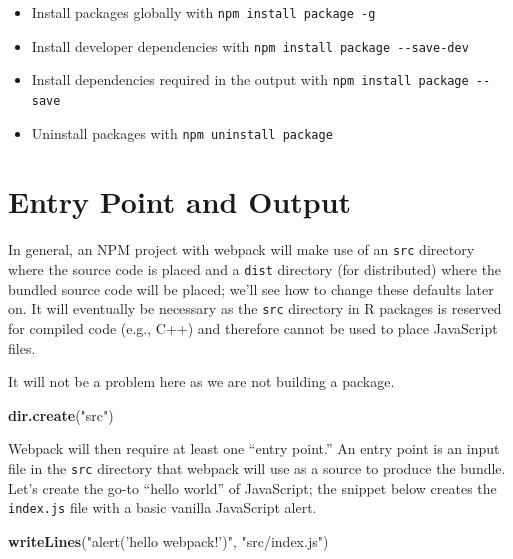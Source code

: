 \documentclass[10pt,]{krantz}
\makeatletter
\newenvironment{Shaded}{\begin{snugshade}}{\end{snugshade}}
\newcommand{\KeywordTok}[1]{\textcolor[rgb]{0.27,0.27,0.27}{\textbf{#1}}}
\newcommand{\NormalTok}[1]{#1}
\newcommand{\StringTok}[1]{\textcolor[rgb]{0.5,0.5,0.5}{#1}}
\providecommand{\tightlist}{%
  \setlength{\itemsep}{0pt}\setlength{\parskip}{0pt}}
\newenvironment{kframe}{%
\medskip{}
\setlength{\fboxsep}{.8em}
 \def\at@end@of@kframe{}%
 \ifinner\ifhmode%
  \def\at@end@of@kframe{\end{minipage}}%
  \begin{minipage}{\columnwidth}%
 \fi\fi%
 \def\FrameCommand##1{\hskip\@totalleftmargin \hskip-\fboxsep
 \colorbox{shadecolor}{##1}\hskip-\fboxsep
     \hskip-\linewidth \hskip-\@totalleftmargin \hskip\columnwidth}%
 \MakeFramed {\advance\hsize-\width
   \@totalleftmargin\z@ \linewidth\hsize
   \@setminipage}}%
 {\par\unskip\endMakeFramed%
 \at@end@of@kframe}
\renewenvironment{Shaded}{\begin{kframe}}{\end{kframe}}
\makeatother
\begin{document}
\begin{itemize}
\tightlist
\item
  Install packages globally with \texttt{npm\ install\ package\ -g}
\item
  Install developer dependencies with \texttt{npm\ install\ package\ -\/-save-dev}
\item
  Install dependencies required in the output with \texttt{npm\ install\ package\ -\/-save}
\item
  Uninstall packages with \texttt{npm\ uninstall\ package}
\end{itemize}

\hypertarget{webpack-intro-entry-points}{%
\section{Entry Point and Output}\label{webpack-intro-entry-points}}

In general, an NPM project with webpack will make use of an \texttt{src} directory where the source code is placed and a \texttt{dist} directory (for distributed) where the bundled source code will be placed; we'll see how to change these defaults later on. It will eventually be necessary as the \texttt{src} directory in R packages is reserved for compiled code (e.g., C++) and therefore cannot be used to place JavaScript files.

It will not be a problem here as we are not building a package.

\begin{Shaded}
\begin{Highlighting}[]
\KeywordTok{dir.create}\NormalTok{(}\StringTok{"src"}\NormalTok{)}
\end{Highlighting}
\end{Shaded}

Webpack will then require at least one ``entry point.'' An entry point is an input file in the \texttt{src} directory that webpack will use as a source to produce the bundle. Let's create the go-to ``hello world'' of JavaScript; the snippet below creates the \texttt{index.js} file with a basic vanilla JavaScript alert.

\begin{Shaded}
\begin{Highlighting}[]
\KeywordTok{writeLines}\NormalTok{(}\StringTok{"alert('hello webpack!')"}\NormalTok{, }\StringTok{"src/index.js"}\NormalTok{) }
\end{Highlighting}
\end{Shaded}
\end{document}
